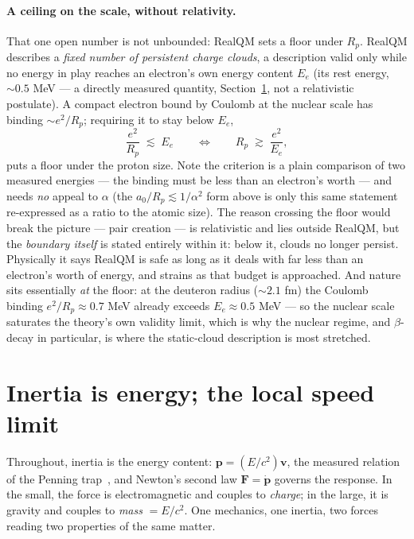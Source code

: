 \documentclass[11pt]{article}
\begin{document}
\paragraph{A ceiling on the scale, without relativity.} That one open number is not unbounded: RealQM sets a
floor under $R_p$. RealQM describes a \emph{fixed number of persistent charge clouds}, a description valid only
while no energy in play reaches an electron's own energy content $E_e$ (its rest energy, ${\sim}0.5$ MeV --- a
directly measured quantity, Section~\ref{sec:inertia}, not a relativistic postulate). A compact electron bound by
Coulomb at the nuclear scale has binding ${\sim}e^2/R_p$; requiring it to stay below $E_e$,
\begin{equation}
\frac{e^2}{R_p}\;\lesssim\;E_e \qquad\Longleftrightarrow\qquad R_p\;\gtrsim\;\frac{e^2}{E_e},
\end{equation}
puts a floor under the proton size. Note the criterion is a plain comparison of two measured energies --- the
binding must be less than an electron's worth --- and needs \emph{no} appeal to $\alpha$ (the $a_0/R_p\lesssim
1/\alpha^2$ form above is only this same statement re-expressed as a ratio to the atomic size). The reason crossing
the floor would break the picture --- pair creation --- is relativistic and lies outside RealQM, but the
\emph{boundary itself} is stated entirely within it: below it, clouds no longer persist. Physically it says RealQM
is safe as long as it deals with far less than an electron's worth of energy, and strains as that budget is
approached. And nature sits essentially \emph{at} the floor: at the deuteron radius (${\sim}2.1$ fm) the Coulomb
binding $e^2/R_p\approx0.7$ MeV already exceeds $E_e\approx0.5$ MeV --- so the nuclear scale saturates the theory's
own validity limit, which is why the nuclear regime, and $\beta$-decay in particular, is where the static-cloud
description is most stretched.

\section{Inertia is energy; the local speed limit}\label{sec:inertia}
Throughout, inertia is the energy content: $\mathbf p=(E/c^2)\mathbf v$, the measured relation of the Penning
trap~\cite{nomass}, and Newton's second law $\mathbf F=\dot{\mathbf p}$ governs the response. In the small, the
force is electromagnetic and couples to \emph{charge}; in the large, it is gravity and couples to \emph{mass}
$=E/c^2$. One mechanics, one inertia, two forces reading two properties of the same matter.
\end{document}
